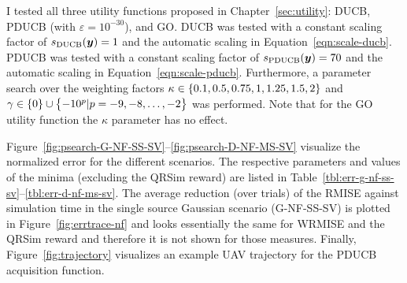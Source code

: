 I tested all three utility functions proposed in Chapter~\ref{sec:utility}: 
DUCB, PDUCB (with $\varepsilon = 10^{-30}$), and GO\@. DUCB was tested with 
a constant scaling factor of $s_{\mathrm{DUCB}}(\bm{y}) = 1$ and the automatic scaling 
in Equation~\ref{eqn:scale-ducb}.  PDUCB was tested with a constant scaling 
factor of $s_{\mathrm{PDUCB}}(\bm{y}) = 70$ and the automatic scaling in 
Equation~\ref{eqn:scale-pducb}.  Furthermore, a parameter search over the 
weighting factors $\kappa \in \cbr{0.1, 0.5, 
0.75, 1, 1.25, 1.5, 2}$ and $\gamma \in \cbr{0} \cup \cbr{-10^p | p = -9, -8, 
  \dots, -2}$ was performed. Note that for the GO utility function the $\kappa$ 
parameter has no effect.

Figure~\ref{fig:psearch-G-NF-SS-SV}--\ref{fig:psearch-D-NF-MS-SV} visualize the 
normalized error for the different scenarios.  The respective parameters and 
values of the minima (excluding the QRSim reward) are listed in 
Table~\ref{tbl:err-g-nf-ss-sv}--\ref{tbl:err-d-nf-ms-sv}.  The average reduction 
(over trials) of the RMISE against simulation time in the single source Gaussian 
scenario (G-NF-SS-SV) is plotted in Figure~\ref{fig:errtrace-nf} and looks 
essentially the same for WRMISE and the QRSim reward and therefore it is not 
shown for those measures. Finally, Figure~\ref{fig:trajectory} visualizes an 
example UAV trajectory for the PDUCB acquisition function.

